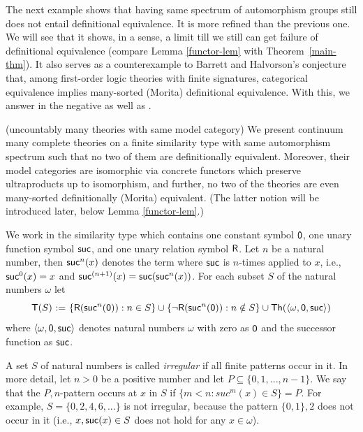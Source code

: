 \documentclass[12pt,leqno]{article}
\newcommand{\de}{\mbox{\ :=\ }}
\newcommand{\Th}{\mbox{\sf Th}}
\newcommand{\T}{\mbox{\sf T}}
\newcommand{\R}{\mbox{\sf R}}
\newcommand{\zero}{\mbox{\sf 0}}
\newcommand{\suc}{\mbox{\sf suc}}
\begin{document}
The next example shows that having same spectrum of automorphism groups still does not entail definitional
equivalence.
%
It is more refined than the previous one. We will see
that it shows, in a sense, a limit till we still can get failure of
definitional equivalence (compare Lemma \ref{functor-lem} with Theorem~\ref{main-thm}).
%
It also serves as a counterexample to Barrett and Halvorson's
conjecture that, among first-order logic theories with finite
signatures, categorical equivalence implies many-sorted (Morita)
definitional equivalence. With this, we answer in the negative
\cite[Question 6.1]{BH16} as well as \cite[Question 1,
p.77]{BDis17}.
\bigskip

(uncountably many theories with same model category) We present continuum many complete theories 
on a finite similarity type with same automorphism spectrum such that no 
two of them are definitionally equivalent. 
Moreover, their model categories are isomorphic via concrete functors
which preserve ultraproducts up to
isomorphism, and further, no two of the theories are even many-sorted definitionally (Morita) equivalent. 
(The latter notion will be introduced later, below Lemma \ref{functor-lem}.)

We work in the similarity type which contains one constant symbol
$\zero$, one unary function symbol $\suc$, and one unary relation
symbol $\R$.  
Let $n$ be a natural number, then $\suc^n(x)$
denotes the term where $\suc$ is $n$-times applied to $x$, i.e.,
$\suc^0(x)=x$ and $\suc^{(n+1)}(x)=\suc(\suc^n(x))$. 
For each subset  $S$ of the natural numbers $\omega$ let
\[ \T(S)\de\{ \R(\suc^n(\zero)) : n\in S\}\cup \{\lnot\R(\suc^n(\zero)) : n\notin S\}\cup\Th(\langle\omega,\zero,\suc\rangle)\]
where $\langle\omega,\zero,\suc\rangle$ denotes natural numbers $\omega$ with zero as $\zero$ and the successor function as $\suc$. 

A set $S$ of natural numbers is called \emph{irregular} if all finite patterns occur in it. In more detail, let $n>0$ be a positive number and let $P\subseteq\{0,1,...,n-1\}$. We say that the $P,n$-pattern occurs at $x$ in $S$ if $\{ m<n: suc^m(x)\in S\}=P$.
%
For example, $S=\{ 0,2,4,6,...\}$ is not irregular, because the pattern $\{0,1\},2$ does not occur in it (i.e., $x,\suc(x)\in S$ does not hold for any $x\in\omega$). 
\end{document}
